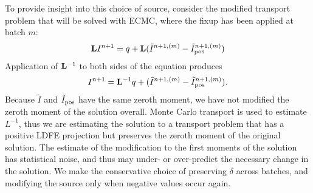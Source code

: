 To provide insight into this choice of source, consider the modified transport problem
that will be solved with ECMC, where the fixup has been applied at batch $m$:
\begin{equation}
   \mathbf{L} I^{n+1} = q + \mathbf{L}(\tilde{I}^{n+1,(m)} -
    \tilde{I}^{n+1,(m)}_{\text{pos}})
\end{equation}
Application of $\mathbf{L}^{-1}$ to both sides of the equation produces
\begin{equation}
    I^{n+1} = \mathbf{L}^{-1} q + (\tilde{I}^{n+1,(m)} -
    \tilde{I}^{n+1,(m)}_{\text{pos}}).
\end{equation}
Because $\tilde I$ and $\tilde I_{\text{pos}}$ have the same zeroth moment, we have not modified
the zeroth moment of the solution overall.  Monte Carlo transport is used to estimate $L^{-1}$, thus 
we are estimating the solution to a transport problem that has a positive LDFE projection but preserves the
zeroth moment of the original solution.  The estimate of the modification to the first
moments of the solution has statistical noise, and thus may under- or over-predict the
necessary change in the solution.  We make the conservative choice of preserving $\delta$
across batches, and modifying the source only when negative values occur again. 


